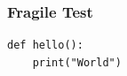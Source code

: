 \begin{frame}
\frametitle{Fragile Test}
\begin{verbatim}
def hello():
    print("World")
\end{verbatim}
\end{frame}
